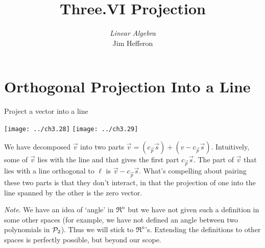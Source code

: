 \documentclass[10pt,t]{beamer}
\title[Projection] %
{Three.VI Projection}
\author{\textit{Linear Algebra} \\ {\small Jim Hef{}feron}}
\institute{
  \texttt{http://joshua.smcvt.edu/linearalgebra}
}
\date{}
\begin{document}
\begin{frame}
  \titlepage
\end{frame}




\section{Orthogonal Projection Into a Line}
\begin{frame}{Project a vector into a line}
\begin{center}
  \texttt{[image: ../ch3.28]}
  \hspace*{0.6in}
  \texttt{[image: ../ch3.29]}      
\end{center}
\pause
{}

\pause
{}
\end{frame}




\begin{frame}
We have decomposed $\vec{v}$ into two parts
$\vec{v}=(c_{\vec{p}}\vec{s})+(v-c_{\vec{p}}\vec{s})$.
Intuitively, some of $\vec{v}$ lies with the line and that gives
the first part $c_{\vec{p}}\vec{s}$.
The part of $\vec{v}$ that lies with a line orthogonal to $\ell$
is $\vec{v}-c_{\vec{p}}\vec{s}$.
What's compelling about pairing these two parts 
is that they don't interact, in that the projection of one into the line
spanned by the other is the zero vector.

\pause\medskip\textit{Note}.
We have an idea of `angle' in $\Re^n$ but we have not given such a 
definition in some other spaces (for example, we have not defined 
an angle between two polynomials in $\mathcal{P}_2$).
Thus we will stick to $\Re^n$'s.
Extending the definitions to other spaces is perfectly possible, but
beyond our scope.
\end{frame}
\end{document}
